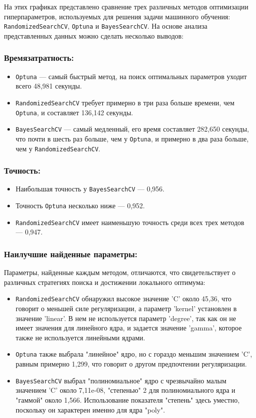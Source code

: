 \documentclass{article}
\begin{document}
На этих графиках представлено сравнение трех различных методов оптимизации гиперпараметров, используемых для решения задачи машинного обучения: \texttt{RandomizedSearchCV}, \texttt{Optuna} и \texttt{BayesSearchCV}. На основе анализа представленных данных можно сделать несколько выводов:

\subsubsection{Времязатратность:}
\begin{itemize}
  \item \texttt{Optuna} --- самый быстрый метод, на поиск оптимальных параметров уходит всего 48,981 секунды.
  \item \texttt{RandomizedSearchCV} требует примерно в три раза больше времени, чем \texttt{Optuna}, и составляет 136,142 секунды.
  \item \texttt{BayesSearchCV} --- самый медленный, его время составляет 282,650 секунды, что почти в шесть раз больше, чем у \texttt{Optuna}, и примерно в два раза больше, чем у \texttt{RandomizedSearchCV}.
\end{itemize}

\subsubsection{Точность:}
\begin{itemize}
  \item Наибольшая точность у \texttt{BayesSearchCV} --- 0,956.
  \item Точность \texttt{Optuna} несколько ниже --- 0,952.
  \item \texttt{RandomizedSearchCV} имеет наименьшую точность среди всех трех методов --- 0,947.
\end{itemize}

\subsubsection{Наилучшие найденные параметры:}
Параметры, найденные каждым методом, отличаются, что свидетельствует о различных стратегиях поиска и достижении локального оптимума:
\begin{itemize}
  \item \texttt{RandomizedSearchCV} обнаружил высокое значение 'C' около 45,36, что говорит о меньшей силе регуляризации, а параметр 'kernel' установлен в значение 'linear'. В нем не используется параметр 'degree', так как он не имеет значения для линейного ядра, и задается значение 'gamma', которое также не используется линейными ядрами.
  \item \texttt{Optuna} также выбрала "линейное" ядро, но с гораздо меньшим значением 'C', равным примерно 1,299, что говорит о другом предпочтении регуляризации.
  \item \texttt{BayesSearchCV} выбрал "полиномиальное" ядро с чрезвычайно малым значением 'C' около 7,11e-08, "степенью" 2 для полиномиального ядра и "гаммой" около 1,566. Использование показателя "степень" здесь уместно, поскольку он характерен именно для ядра "poly".
\end{itemize}
\end{document}
